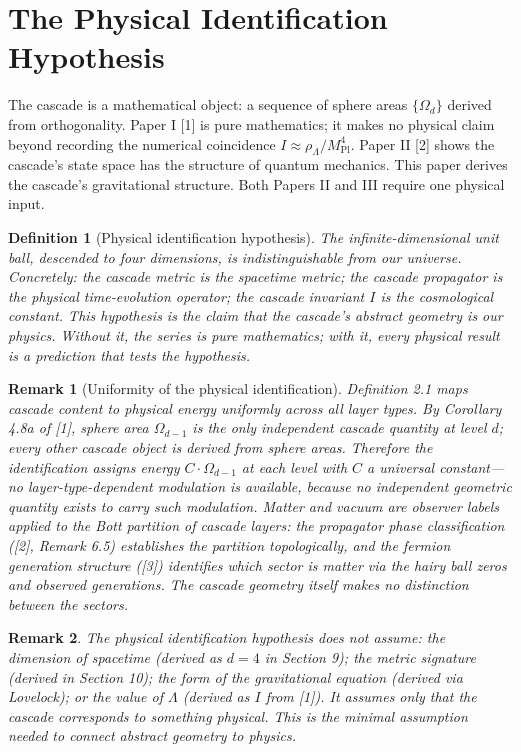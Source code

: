 \documentclass[12pt,a4paper]{article}
\newtheorem{definition}[theorem]{Definition}
\newtheorem*{remark}{Remark}
\begin{document}
\section{The Physical Identification Hypothesis}

The cascade is a mathematical object: a sequence of sphere areas $\{\Omega_d\}$ derived from
orthogonality. Paper I [1] is pure mathematics; it makes no physical claim beyond recording
the numerical coincidence $I \approx \rho_\Lambda/M_{\text{Pl}}^4$. Paper II [2] shows the cascade's state space has the
structure of quantum mechanics. This paper derives the cascade's gravitational structure.
Both Papers II and III require one physical input.

\begin{definition}[Physical identification hypothesis]
The infinite-dimensional unit ball,
descended to four dimensions, is indistinguishable from our universe. Concretely: the
cascade metric is the spacetime metric; the cascade propagator is the physical time-evolution
operator; the cascade invariant $I$ is the cosmological constant. This hypothesis is the
claim that the cascade's abstract geometry is our physics. Without it, the series is pure
mathematics; with it, every physical result is a prediction that tests the hypothesis.
\end{definition}

\begin{remark}[Uniformity of the physical identification]
Definition 2.1 maps cascade
content to physical energy uniformly across all layer types. By Corollary 4.8a of [1], sphere
area $\Omega_{d-1}$ is the only independent cascade quantity at level $d$; every other cascade object
is derived from sphere areas. Therefore the identification assigns energy $C \cdot \Omega_{d-1}$ at each
level with $C$ a universal constant---no layer-type-dependent modulation is available, because
no independent geometric quantity exists to carry such modulation. Matter and vacuum
are observer labels applied to the Bott partition of cascade layers: the propagator phase
classification ([2], Remark 6.5) establishes the partition topologically, and the fermion
generation structure ([3]) identifies which sector is matter via the hairy ball zeros and
observed generations. The cascade geometry itself makes no distinction between the sectors.
\end{remark}

\begin{remark}
The physical identification hypothesis does not assume: the dimension of
spacetime (derived as $d = 4$ in Section 9); the metric signature (derived in Section 10);
the form of the gravitational equation (derived via Lovelock); or the value of $\Lambda$ (derived as
$I$ from [1]). It assumes only that the cascade corresponds to something physical. This is
the minimal assumption needed to connect abstract geometry to physics.
\end{remark}
\end{document}
